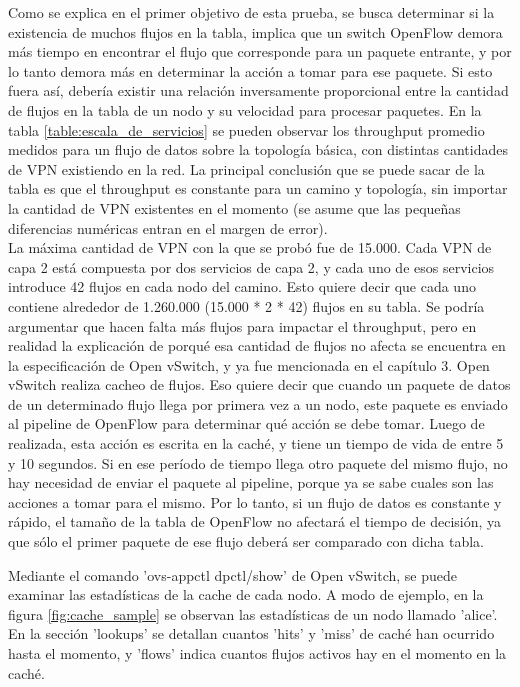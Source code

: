 Como se explica en el primer objetivo de esta prueba, se busca determinar si la existencia de muchos flujos en la tabla, implica que un switch OpenFlow demora más tiempo en encontrar el flujo que corresponde para un paquete entrante, y por lo tanto demora más en determinar la acción a tomar para ese paquete. Si esto fuera así, debería existir una relación inversamente proporcional entre la cantidad de flujos en la tabla de un nodo y su velocidad para procesar paquetes. En la tabla \ref{table:escala_de_servicios} se pueden observar los throughput promedio medidos para un flujo de datos sobre la topología básica, con distintas cantidades de VPN existiendo en la red. La principal conclusión que se puede sacar de la tabla es que el throughput es constante para un camino y topología, sin importar la cantidad de VPN existentes en el momento (se asume que las pequeñas diferencias numéricas entran en el margen de error). \\
La máxima cantidad de VPN con la que se probó fue de 15.000. Cada VPN de capa 2 está compuesta por dos servicios de capa 2, y cada uno de esos servicios introduce 42 flujos en cada nodo del camino. Esto quiere decir que cada uno contiene alrededor de 1.260.000 (15.000 * 2 * 42) flujos en su tabla. Se podría argumentar que hacen falta más flujos para impactar el throughput, pero en realidad la explicación de porqué esa cantidad de flujos no afecta se encuentra en la especificación de Open vSwitch, y ya fue mencionada en el capítulo 3. Open vSwitch realiza cacheo de flujos. Eso quiere decir que cuando un paquete de datos de un determinado flujo llega por primera vez a un nodo, este paquete es enviado al pipeline de OpenFlow para determinar qué acción se debe tomar. Luego de realizada, esta acción es escrita en la caché, y tiene un tiempo de vida de entre 5 y 10 segundos. Si en ese período de tiempo llega otro paquete del mismo flujo, no hay necesidad de enviar el paquete al pipeline, porque ya se sabe cuales son las acciones a tomar para el mismo. Por lo tanto, si un flujo de datos es constante y rápido, el tamaño de la tabla de OpenFlow no afectará el tiempo de decisión, ya que sólo el primer paquete de ese flujo deberá ser comparado con dicha tabla.

Mediante el comando 'ovs-appctl dpctl/show' de Open vSwitch, se puede examinar las estadísticas de la cache de cada nodo. A modo de ejemplo, en la figura \ref{fig:cache_sample} se observan las estadísticas de un nodo llamado 'alice'. En la sección 'lookups' se detallan cuantos 'hits' y 'miss' de caché han ocurrido hasta el momento, y 'flows' indica cuantos flujos activos hay en el momento en la caché.

